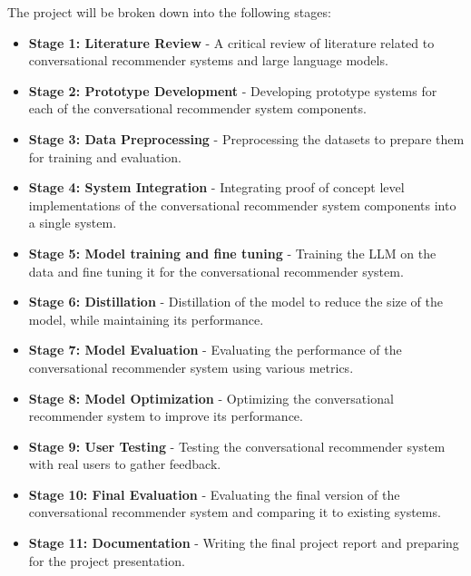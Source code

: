 

The project will be broken down into the following stages:
\begin{itemize}
    \item \textbf{Stage 1: Literature Review} - A critical review of literature related to conversational recommender systems and large language models.
    \item \textbf{Stage 2: Prototype Development} - Developing prototype systems for each of the conversational recommender system components.
    \item \textbf{Stage 3: Data Preprocessing} - Preprocessing the datasets to prepare them for training and evaluation.
    \item \textbf{Stage 4: System Integration} - Integrating proof of concept level implementations of the conversational recommender system components into a single system.
    \item \textbf{Stage 5: Model training and fine tuning} - Training the LLM on the data and fine tuning it for the conversational recommender system.
    \item \textbf{Stage 6: Distillation} - Distillation of the model to reduce the size of the model, while maintaining its performance.
    \item \textbf{Stage 7: Model Evaluation} - Evaluating the performance of the conversational recommender system using various metrics.
    \item \textbf{Stage 8: Model Optimization} - Optimizing the conversational recommender system to improve its performance.
    \item \textbf{Stage 9: User Testing} - Testing the conversational recommender system with real users to gather feedback.
    \item \textbf{Stage 10: Final Evaluation} - Evaluating the final version of the conversational recommender system and comparing it to existing systems.
    \item \textbf{Stage 11: Documentation} - Writing the final project report and preparing for the project presentation.
\end{itemize}









